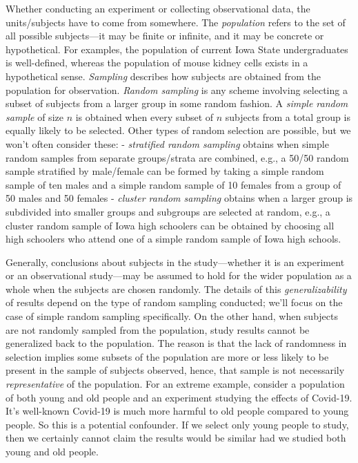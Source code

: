 \documentclass[
]{book}
\begin{document}
Whether conducting an experiment or collecting observational data, the units/subjects have to come from somewhere. The \emph{population} refers to the set of all possible subjects---it may be finite or infinite, and it may be concrete or hypothetical. For examples, the population of current Iowa State undergraduates is well-defined, whereas the population of mouse kidney cells exists in a hypothetical sense. \emph{Sampling} describes how subjects are obtained from the population for observation. \emph{Random sampling} is any scheme involving selecting a subset of subjects from a larger group in some random fashion. A \emph{simple random sample} of size \(n\) is obtained when every subset of \(n\) subjects from a total group is equally likely to be selected. Other types of random selection are possible, but we won't often consider these:
- \emph{stratified random sampling} obtains when simple random samples from separate groups/strata are combined, e.g., a 50/50 random sample stratified by male/female can be formed by taking a simple random sample of ten males and a simple random sample of 10 females from a group of 50 males and 50 females
- \emph{cluster random sampling} obtains when a larger group is subdivided into smaller groups and subgroups are selected at random, e.g., a cluster random sample of Iowa high schoolers can be obtained by choosing all high schoolers who attend one of a simple random sample of Iowa high schools.

Generally, conclusions about subjects in the study---whether it is an experiment or an observational study---may be assumed to hold for the wider population as a whole when the subjects are chosen randomly. The details of this \emph{generalizability} of results depend on the type of random sampling conducted; we'll focus on the case of simple random sampling specifically. On the other hand, when subjects are not randomly sampled from the population, study results cannot be generalized back to the population. The reason is that the lack of randomness in selection implies some subsets of the population are more or less likely to be present in the sample of subjects observed, hence, that sample is not necessarily \emph{representative} of the population. For an extreme example, consider a population of both young and old people and an experiment studying the effects of Covid-19. It's well-known Covid-19 is much more harmful to old people compared to young people. So this is a potential confounder. If we select only young people to study, then we certainly cannot claim the results would be similar had we studied both young and old people.
\end{document}
